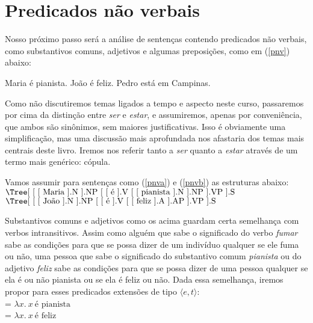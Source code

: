 \section{Predicados não verbais}

Nosso próximo passo será a análise de sentenças contendo
predicados não verbais, como substantivos comuns, adjetivos e algumas
preposições, como em (\ref{pnv}) abaixo:
\begin{exe}
\ex\label{pnv}
\begin{xlist}
\ex Maria é pianista.\label{pnva}
\ex João é feliz.\label{pnvb}
\ex Pedro está em Campinas.\label{pnvc}
\end{xlist}
\end{exe}

\n Como não discutiremos temas ligados a tempo e aspecto neste
curso, passaremos por cima da distinção entre \textit{ser} e \textit{estar}, e
assumiremos, apenas por conveniência, que ambos são sinônimos, sem
maiores justificativas. Isso é obviamente uma simplificação, mas
uma discussão mais aprofundada nos afastaria dos temas mais
centrais deste livro. Iremos nos referir tanto a \textit{ser} quanto a
\textit{estar} através de um termo mais genérico: cópula.

Vamos assumir para sentenças como (\ref{pnva}) e (\ref{pnvb})
as estruturas abaixo:\\

$\vcenter{%
	\hbox{\Tree [ [ [ Maria ].N ].NP [ [ é ].V [ [ pianista ].N ].NP ].VP ].S }} $ \hspace{1in} $ \vcenter{%
	\hbox{\Tree [ [ [ João ].N ].NP [ [ é ].V [ [ feliz ].A ].AP ].VP ].S }} $


\bigskip

\n Substantivos comuns e adjetivos como os acima guardam certa
semelhança com verbos intransitivos. Assim como alguém que sabe o
significado do verbo \textit{fumar} sabe as condições para que se
possa dizer de um indivíduo qualquer se ele fuma ou não, uma pessoa que
sabe o significado do substantivo comum \textit{pianista} ou do adjetivo \textit{feliz} sabe as condições para que se possa dizer de uma
pessoa qualquer se ela é ou não pianista ou se ela é feliz ou não. Dada essa
semelhança, iremos propor para esses predicados extensões de tipo
$\langle e,t \rangle$:\\

\n {} = $\lambda x.\ x\ \text{é pianista}$\\

\n {} = $\lambda x.\ x\ \text{é feliz}$\\

